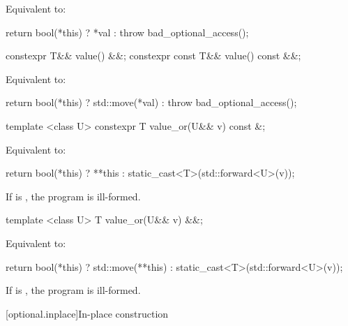 \begin{itemdescr}
\pnum
\effects
Equivalent to:
\begin{codeblock}
return bool(*this) ? *val : throw bad_optional_access();
\end{codeblock}
\end{itemdescr}

\begin{itemdecl}
constexpr T&& value() &&;
constexpr const T&& value() const &&;
\end{itemdecl}

\begin{itemdescr}

\pnum
\effects
Equivalent to:
\begin{codeblock}
return bool(*this) ? std::move(*val) : throw bad_optional_access();
\end{codeblock}
\end{itemdescr}

%
%
\begin{itemdecl}
template <class U> constexpr T value_or(U&& v) const &;
\end{itemdecl}

\begin{itemdescr}
\pnum
\effects
Equivalent to:
\begin{codeblock}
return bool(*this) ? **this : static_cast<T>(std::forward<U>(v));
\end{codeblock}

\pnum
\remarks
If  is ,
the program is ill-formed.
\end{itemdescr}

\begin{itemdecl}
template <class U> T value_or(U&& v) &&;
\end{itemdecl}

\begin{itemdescr}
\pnum
\effects
Equivalent to:
\begin{codeblock}
return bool(*this) ? std::move(**this) : static_cast<T>(std::forward<U>(v));
\end{codeblock}

\pnum
\remarks
If  is ,
the program is ill-formed.
\end{itemdescr}

[optional.inplace]{In-place construction}

